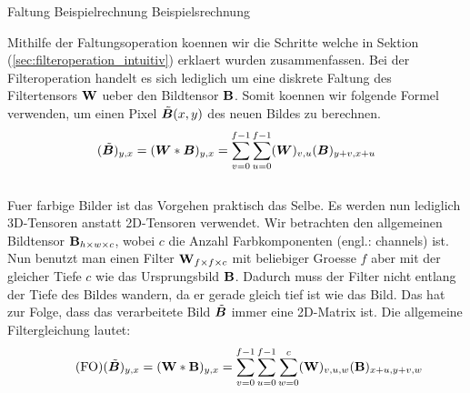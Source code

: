 \begin{examplebox}{Faltung Beispielrechnung}
  Beispielsrechnung
\end{examplebox}


Mithilfe der Faltungsoperation koennen wir die Schritte welche in Sektion
(\ref{sec:filteroperation_intuitiv}) erklaert wurden zusammenfassen.
Bei der Filteroperation handelt es sich lediglich um eine diskrete Faltung des
Filtertensors $\mathbf{W}$ ueber den Bildtensor $\mathbf{B}$. Somit koennen wir
folgende Formel verwenden, um einen Pixel $\tilde{\bm{B}}(x,y)$ des neuen Bildes zu berechnen.
\\
\begin{equation}
  (\tilde{\bm{B}})_{y,x} = (\bm{W} * \bm{B})_{y,x} = \sum_{v=0}^{f-1} \sum_{u=0}^{f-1} (\bm{W})_{v,u}(\bm{B})_{y+v,x+u}
\end{equation}
\\
Fuer farbige Bilder ist das Vorgehen praktisch das Selbe. Es werden nun
lediglich 3D-Tensoren anstatt 2D-Tensoren verwendet. Wir betrachten den
allgemeinen Bildtensor $\mathbf{B}_{h \times w \times c}$, wobei $c$ die Anzahl
Farbkomponenten (engl.: channels) ist.
Nun benutzt man einen Filter $\mathbf{W}_{f \times f \times c}$ mit beliebiger Groesse
$f$ aber mit der gleicher Tiefe $c$ wie das Ursprungsbild $\mathbf{B}$.
Dadurch muss der Filter nicht entlang der Tiefe des Bildes wandern, da er
gerade gleich tief ist wie das Bild. Das hat zur Folge, dass das verarbeitete
Bild $\tilde{\bm{B}}$ immer eine 2D-Matrix ist.
Die allgemeine Filtergleichung lautet:
\\
\begin{equation}\tag{FO}
  (\tilde{\bm{B}})_{y,x} = (\mathbf{W} * \mathbf{B})_{y,x} = \sum_{v=0}^{f-1} \sum_{u=0}^{f-1} \sum_{w=0}^c (\mathbf{W})_{v,u,w} (\mathbf{B})_{x+u,y+v,w}
\end{equation}

\para{}
\cite{Goodfellow-et-al-2016}
\cite{deeplearning.ai:cnn}
\cite{wiki:cnn}

